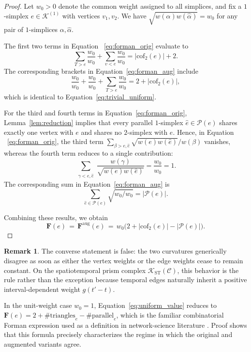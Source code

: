 \documentclass[
    pre,
    twocolumn,
    superscriptaddress,
    showpacs,
    nofootinbib,
    amsmath,
    amssymb,
    floatfix
]{revtex4-2}
\newcommand{\K}{\mathcal{K}}
\newcommand{\F}{\mathbf{F}}        %
\newcommand{\Faug}{\F^{\mathrm{aug}}}
\theoremstyle{plain} %
\theoremstyle{definition} %
\newtheorem{remark}{\indent Remark}
\begin{document}
\begin{proof}
Let $w_0>0$ denote the common weight assigned to all simplices, and fix a $1$-simplex $e\in\K^{(1)}$ with vertices $v_1,v_2$.
We have $\sqrt{w(\alpha)w(\hat\alpha)} = w_0$ for any pair of $1$-simplices $\alpha,\hat\alpha$.

The first two terms in Equation ~\eqref{eq:forman_orig} evaluate to
\begin{equation}\label{eq:trivial_uniform}
    \sum_{T>e}\!\frac{w_0}{w_0}+\sum_{v<e}\!\frac{w_0}{w_0}
    = |\mathrm{cof}_2(e)|+2.
\end{equation}
The corresponding brackets in Equation~\eqref{eq:forman_aug} include
\begin{equation}
    \frac{w_0}{w_0}+\frac{w_0}{w_0}+\sum_{T>e}\!\frac{w_0}{w_0}
    = 2+|\mathrm{cof}_2(e)|,
\end{equation}
which is identical to Equation~\eqref{eq:trivial_uniform}.

For the third and fourth terms in Equation~\eqref{eq:forman_orig}, Lemma~\ref{lem:reduction} implies that every parallel $1$-simplex $\hat e\in\mathcal P(e)$ shares exactly one vertex with $e$ and shares no $2$-simplex with $e$.
Hence, in Equation ~\eqref{eq:forman_orig}, the third term $\sum_{\beta>e,\hat e}\!\sqrt{w(e)w(\hat e)}/w(\beta)$ vanishes, whereas the fourth term reduces to a single contribution:
\begin{equation*}
\sum_{\substack{\gamma<e,\hat e}}\!\frac{w(\gamma)}{\sqrt{w(e)w(\hat e)}}
= \frac{w_0}{w_0} = 1.
\end{equation*}
The corresponding sum in Equation~\eqref{eq:forman_aug} is
\begin{equation*}
\sum_{\hat e\in\mathcal P(e)}\!\sqrt{w_0/w_0}
= |\mathcal P(e)|.
\end{equation*}

Combining these results, we obtain
\begin{equation}\label{eq:uniform_value}
\F(e) \,=\, \Faug(e) \,=\, w_0\bigl(2+|\mathrm{cof}_2(e)|-|\mathcal P(e)|\bigr).
\end{equation}
\end{proof}
\begin{remark}
The converse statement is false: the two curvatures generically disagree as soon as either the vertex weights or the edge weights cease to remain constant.
On the spatiotemporal prism complex $\K_{\mathrm{ST}}(\mathcal{C})$, this behavior is the rule rather than the exception because temporal edges naturally inherit a positive interval-dependent weight $g(t'-t)$.

In the unit-weight case $w_0=1$, Equation~\eqref{eq:uniform_value} reduces to $\F(e)=2+\#\text{triangles}_e-\#\text{parallel}_e$, which is the familiar combinatorial Forman expression used as a definition in network-science literature \cite{Sreejith2016}.
Proof shows that this formula precisely characterizes the regime in which the original and augmented variants agree.
\end{remark}
\end{document}
